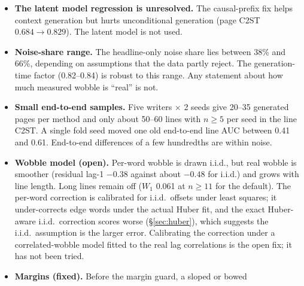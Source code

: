 \documentclass[11pt,a4paper]{article}
\newcommand{\src}[1]{{\footnotesize\texttt{#1}}}
\begin{document}
\begin{itemize}
  margin guard; the manual layout's rate is 1.7\%. With writer context the
  rate is higher: 20\% (92 of 464) in the final run, down from 26\% (125 of
  478) with the leverage model; some context writers slope close to the
  extractor's 0.15 slope limit (e.g.\ image\_77, mean slope about $-0.15$
  on generated pages). The split lines are the steep or bowed ones
  (\S\ref{sec:e2e}); counts for all runs and variants are in
  \src{runs/compare\_unfitw/split\_counts.txt}. End-to-end metrics are
  computed on the surviving lines only, so slope and drift $W_1$ are biased
  towards straight lines and are not comparable across runs with different
  split rates, and $x_\text{start}$ $W_1$ is inflated by fragments. The
  planner reset and the curvature deconvolution address two causes. The lines
  that still split are again the steeper ones (median $|$slope$|$ 0.052), but
  why the chainer fails on them has not been analysed for this run.
\item \textbf{The latent model regression is unresolved.} The causal-prefix
  fix helps context generation but hurts unconditional generation
  (page C2ST $0.684\to0.829$). The latent model is not used.
\item \textbf{Noise-share range.} The headline-only noise share lies between
  38\% and 66\%, depending on assumptions that the data partly reject. The
  generation-time factor (0.82--0.84) is robust to this range. Any statement
  about how much measured wobble is ``real'' is not.
\item \textbf{Small end-to-end samples.} Five writers $\times$ 2 seeds give
  20--35 generated pages per method and only about 50--60 lines with $n\ge5$ per
  seed in the line C2ST. A single fold seed moved one old end-to-end line AUC
  between 0.41 and 0.61. End-to-end differences of a few hundredths are
  within noise.
\item \textbf{Wobble model (open).} Per-word wobble is drawn i.i.d., but real
  wobble is smoother (residual lag-1 $-0.38$ against about $-0.48$ for
  i.i.d.) and grows with line length. Long lines remain off ($W_1$ 0.061 at
  $n\ge11$ for the default). The per-word correction is calibrated for i.i.d.\
  offsets under least squares; it under-corrects edge words under the actual
  Huber fit, and the exact Huber-aware i.i.d.\ correction scores worse
  (\S\ref{sec:huber}), which suggests the i.i.d.\ assumption is the larger
  error. Calibrating the correction under a correlated-wobble model fitted to
  the real lag correlations is the open fix; it has not been tried.
\item \textbf{Margins (fixed).} Before the margin guard, a sloped or bowed

\end{itemize}
\end{document}

